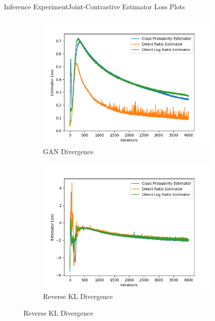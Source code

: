 \documentclass{beamer}
\begin{document}
\begin{frame}{Inference Experiment}{Joint-Contrastive Estimator Loss Plots}
\begin{figure}
\begin{subfigure}{0.49\textwidth}
\includegraphics[width=\linewidth]{part2estimatorlosses/JCADVvsJCADVexpvsJCADVgudlog.png}
\caption{GAN Divergence}
\end{subfigure}
\begin{subfigure}{0.49\textwidth}
\includegraphics[width=\linewidth]{part2estimatorlosses/JCKLDvsJCKLexpvsJCKLgudlog.png}
\caption{Reverse KL Divergence}
\end{subfigure}
\end{figure}
\end{frame}
\end{document}
